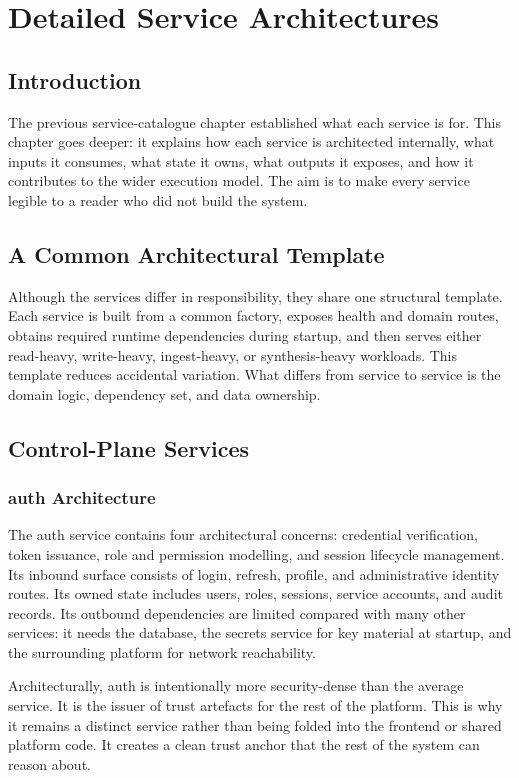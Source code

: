 \chapter{Detailed Service Architectures}
\thispagestyle{plain}
\section*{Introduction}
The previous service-catalogue chapter established what each service is for. This chapter goes deeper: it explains how each service is architected internally, what inputs it consumes, what state it owns, what outputs it exposes, and how it contributes to the wider execution model. The aim is to make every service legible to a reader who did not build the system.

\section{A Common Architectural Template}
Although the services differ in responsibility, they share one structural template. Each service is built from a common factory, exposes health and domain routes, obtains required runtime dependencies during startup, and then serves either read-heavy, write-heavy, ingest-heavy, or synthesis-heavy workloads. This template reduces accidental variation. What differs from service to service is the domain logic, dependency set, and data ownership.

\section{Control-Plane Services}
\subsection{auth Architecture}
The auth service contains four architectural concerns: credential verification, token issuance, role and permission modelling, and session lifecycle management. Its inbound surface consists of login, refresh, profile, and administrative identity routes. Its owned state includes users, roles, sessions, service accounts, and audit records. Its outbound dependencies are limited compared with many other services: it needs the database, the secrets service for key material at startup, and the surrounding platform for network reachability.

Architecturally, auth is intentionally more security-dense than the average service. It is the issuer of trust artefacts for the rest of the platform. This is why it remains a distinct service rather than being folded into the frontend or shared platform code. It creates a clean trust anchor that the rest of the system can reason about.

